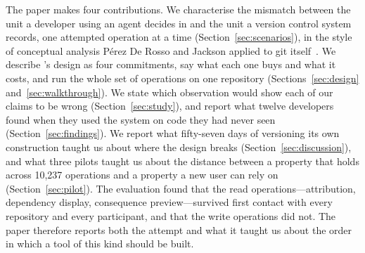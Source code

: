 The paper makes four contributions. We characterise the mismatch between the unit
a developer using an agent decides in and the unit a version control system
records, one attempted operation at a time (Section~\ref{sec:scenarios}), in the
style of conceptual analysis Pérez De Rosso and Jackson applied to git
itself~\cite{perezderosso2013,perezderosso2016}. We describe \sgt{}'s design as
four commitments, say what each one buys and what it costs, and run the whole set
of operations on one repository (Sections~\ref{sec:design}
and~\ref{sec:walkthrough}). We state which observation would show each of our
claims to be wrong (Section~\ref{sec:study}), and report what twelve developers
found when they used the system on code they had never seen
(Section~\ref{sec:findings}). We report what fifty-seven days of \sgt{} versioning
its own construction taught us about where the design breaks
(Section~\ref{sec:discussion}), and what three pilots taught us about the distance
between a property that holds across 10{,}237 operations and a property a new user
can rely on (Section~\ref{sec:pilot}). The evaluation found that the read
operations---attribution, dependency display, consequence preview---survived
first contact with every repository and every participant, and that the write
operations did not. The paper therefore reports both the attempt and what it
taught us about the order in which a tool of this kind should be built.
